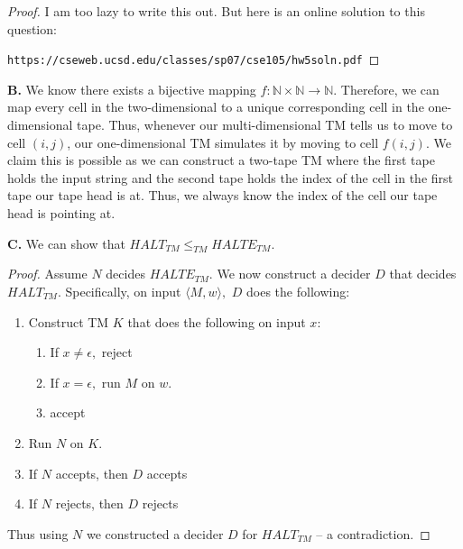 \documentclass[10pt]{article}
\begin{document}
\begin{proof}
    I am too lazy to write this out. But here is an online solution to this question: 
    
    \texttt{https://cseweb.ucsd.edu/classes/sp07/cse105/hw5soln.pdf}

\end{proof}

\noindent
\textbf{B. }We know there exists a bijective mapping $f:\mathbb{N}\times\mathbb{N}\to\mathbb{N}.$ Therefore, we can map every cell in the two-dimensional to a unique corresponding cell in the one-dimensional tape. Thus, whenever our multi-dimensional TM tells us to move to cell $(i,j)$, our one-dimensional TM simulates it by moving to cell $f(i,j).$ We claim this is possible as we can construct a two-tape TM where the first tape holds the input string and the second tape holds the index of the cell in the first tape our tape head is at. Thus, we always know the index of the cell our tape head is pointing at.

\noindent
\textbf{C. }We can show that $HALT_{TM}\le_{TM}\textit{HALTE}_{TM}.$
\begin{proof}
Assume $N$ decides $\textit{HALTE}_{TM}.$ We now construct a decider $D$ that decides $HALT_{TM}.$ Specifically, on input $\langle M,w\rangle,$ $D$ does the following:
\begin{enumerate}
    \item Construct TM $K$ that does the following on input $x$:\begin{enumerate}
        \item If $x\neq \epsilon,$ reject
        \item If $x= \epsilon,$ run $M$ on $w.$
        \item accept
    \end{enumerate}
    \item Run $N$ on $K.$
    \item If $N$ accepts, then $D$ accepts
    \item If $N$ rejects, then $D$ rejects
\end{enumerate}
\noindent
Thus using $N$ we constructed a decider $D$ for $HALT_{TM}$ -- a contradiction. 
\end{proof}
\end{document}
